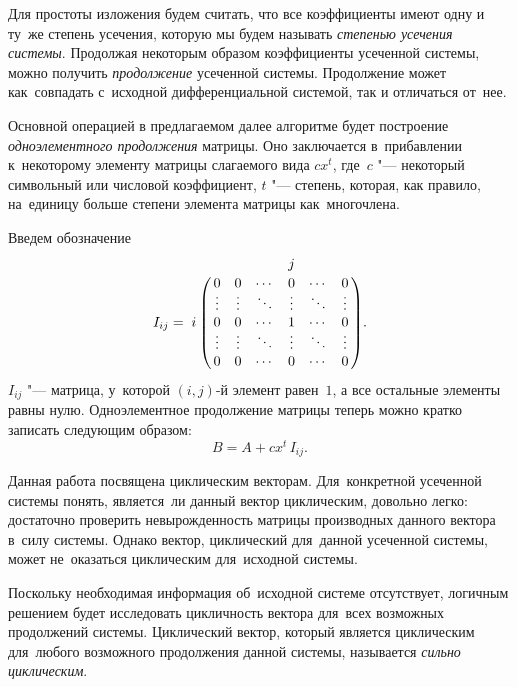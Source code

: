 Для простоты изложения будем считать, что все коэффициенты имеют одну и ту~же степень усечения,
которую мы будем называть \emph{степенью усечения системы}.
Продолжая некоторым образом коэффициенты усеченной системы, можно получить \emph{продолжение} усеченной системы.
Продолжение может как~совпадать с~исходной дифференциальной системой, так и отличаться от~нее.

Основной операцией в предлагаемом далее алгоритме будет построение \emph{одноэлементного продолжения} матрицы.
Оно заключается в~прибавлении к~некоторому элементу матрицы слагаемого вида $cx^t$,
где~$c$ "--- некоторый символьный или числовой коэффициент,
$t$ "--- степень, которая, как правило, на~единицу больше степени элемента матрицы как~многочлена.

Введем обозначение
\begin{equation*}
	I_{ij} = 
	\bordermatrix{
		&           &         &        & j      &        &        \cr
		&   0       & 0       & \cdots & 0      & \cdots & 0      \cr
		&   \vdots  & \vdots  & \ddots & \vdots & \ddots & \vdots \cr
		i & 0       & 0       & \cdots & 1      & \cdots & 0      \cr
		&   \vdots  & \vdots  & \ddots & \vdots & \ddots & \vdots \cr
		&   0       & 0       & \cdots & 0      & \cdots & 0      \cr
	}.
\end{equation*}
$I_{ij}$ "--- матрица, у~которой $(i, j)$-й элемент равен~$1$, а все остальные элементы равны нулю.
Одноэлементное продолжение матрицы теперь можно кратко записать следующим образом:
\begin{equation*}
	B = A + cx^t \, I_{ij}.
\end{equation*}

Данная работа посвящена циклическим векторам.
Для~конкретной усеченной системы понять, является~ли данный вектор циклическим, довольно легко:
достаточно проверить невырожденность матрицы производных данного вектора в~силу системы.
Однако вектор, циклический для~данной усеченной системы, может не~оказаться циклическим для~исходной системы.

Поскольку необходимая информация об~исходной системе отсутствует,
логичным решением будет исследовать цикличность вектора для~всех возможных продолжений системы.
Циклический вектор, который является циклическим для~любого возможного продолжения данной системы,
называется \emph{сильно циклическим}.

